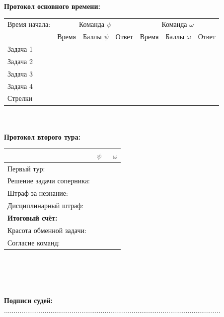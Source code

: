 \documentclass[12pt]{article}
\begin{document}
\begin{center}{\bf Протокол основного времени: } \\ 
\begin{tabular}{|p{3.3cm}|p{1.5cm}|p{2cm}|p{1.5cm}|p{1.5cm}|p{2cm}|p{1.5cm}|}
\hline Время начала: & \multicolumn{3}{c|}{Команда $\psi$} & \multicolumn{3}{c|}{Команда $\omega$ }\\\cline{2-7} {} & Время & Баллы $\psi$ & Ответ & Время & Баллы $\omega$ & Ответ \\\hline \hline \center Задача 1 &{}&{}&{}&{}&{}&{}\\[20mm]\hline \hline \center Задача 2 &{}&{}&{}&{}&{}&{}\\[20mm]\hline \hline \center Задача 3 &{}&{}&{}&{}&{}&{}\\[20mm]\hline \hline \center Задача 4 &{}&{}&{}&{}&{}&{}\\[20mm]\hline \hline \center Стрелки &{}&{}&{}&{}&{}&{}\\[20mm]\hline
\end{tabular}
$ $\\
$ $\\
{\bf Протокол второго тура: } \\ 
\begin{tabular}{ | p{7cm} | p{1cm} | p{1cm} |}
\hline
$ $ & \centering $\psi$ & $\;$ $\omega$ \\ \hline\raggedleft Первый тур: & & \\ \hline\raggedleft Решение задачи соперника: & & \\ \hline\raggedleft Штраф за незнание: & & \\ \hline\raggedleft Дисциплинарный штраф: & & \\ \hline\raggedleft \bf Итоговый счёт: & & \\ \hline \hline\raggedleft Красота обменной задачи: & & \\ \hline\raggedleft Согласие команд: & & \\ \hline\end{tabular}\end{center}
$ $\\
$ $\\
$ $\\
$ $\\
{\bf Подписи судей: }................................................................................................................\newpage
\end{document}
